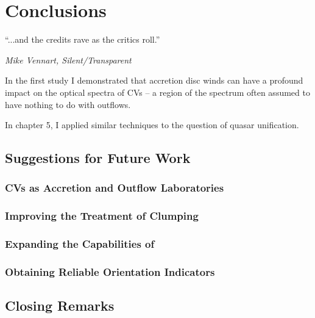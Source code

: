 \chapter{Conclusions}

\epigraph{``...and the credits rave as the critics roll.''}{{\sl Mike Vennart, Silent/Transparent}}

In the first study I demonstrated that accretion disc winds
can have a profound impact on the optical spectra of CVs -- a region
of the spectrum often assumed to have nothing to do with outflows.

In chapter 5, I applied similar techniques to the question of quasar 
unification.

\section{Suggestions for Future Work}

\subsection{CVs as Accretion and Outflow Laboratories}

\subsection{Improving the Treatment of Clumping}

\subsection{Expanding the Capabilities of \py}

\subsection{Obtaining Reliable Orientation Indicators}

\section{Closing Remarks}












